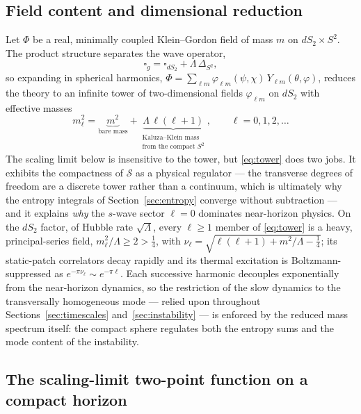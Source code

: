\documentclass[11pt]{article}
\begin{document}
\subsection{Field content and dimensional reduction}

Let $\Phi$ be a real, minimally coupled Klein--Gordon field of mass $m$ on $dS_2 \times S^2$. The product structure separates the wave operator,
\begin{equation}
\square_g = \square_{dS_2} + \Lambda\, \Delta_{S^2},
\end{equation}
so expanding in spherical harmonics, $\Phi = \sum_{\ell m} \varphi_{\ell m}(\psi,\chi)\, Y_{\ell m}(\theta,\varphi)$, reduces the theory to an infinite tower of two-dimensional fields $\varphi_{\ell m}$ on $dS_2$ with effective masses
\begin{equation}
m_\ell^2 = \underbrace{m^2}_{\text{bare mass}} + \underbrace{\Lambda\,\ell(\ell+1)}_{\substack{\text{Kaluza--Klein mass}\\ \text{from the compact } S^2}}, \qquad \ell = 0, 1, 2, \dots
\label{eq:tower}
\end{equation}
The scaling limit below is insensitive to the tower, but \eqref{eq:tower} does two jobs. It exhibits the compactness of $\mathcal{S}$ as a physical regulator --- the transverse degrees of freedom are a discrete tower rather than a continuum, which is ultimately why the entropy integrals of Section~\ref{sec:entropy} converge without subtraction --- and it explains \emph{why} the $s$-wave sector $\ell = 0$ dominates near-horizon physics. On the $dS_2$ factor, of Hubble rate $\sqrt{\Lambda}$, every $\ell \ge 1$ member of \eqref{eq:tower} is a heavy, principal-series field, $m_\ell^2/\Lambda \ge 2 > \tfrac{1}{4}$, with $\nu_\ell = \sqrt{\ell(\ell+1) + m^2/\Lambda - \tfrac{1}{4}}$; its static-patch correlators decay rapidly and its thermal excitation is Boltzmann-suppressed as $e^{-\pi\nu_\ell} \sim e^{-\pi\ell}$. Each successive harmonic decouples exponentially from the near-horizon dynamics, so the restriction of the slow dynamics to the transversally homogeneous mode --- relied upon throughout Sections~\ref{sec:timescales} and~\ref{sec:instability} --- is enforced by the reduced mass spectrum itself: the compact sphere regulates both the entropy sums and the mode content of the instability.

\subsection{The scaling-limit two-point function on a compact horizon}
\end{document}
